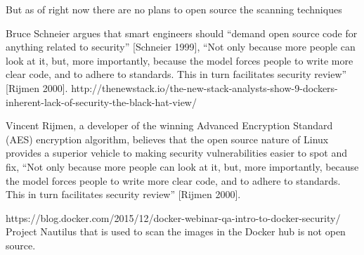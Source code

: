 %


But as of right now there are no plans to open source the scanning techniques


Bruce Schneier argues that smart engineers should “demand open source code for anything related to security” [Schneier 1999],
“Not only because more people can look at it, but, more importantly, because the model forces people to write more clear code, and to adhere to standards. This in turn facilitates security review” [Rijmen 2000].
http://thenewstack.io/the-new-stack-analysts-show-9-dockers-inherent-lack-of-security-the-black-hat-view/

Vincent Rijmen, a developer of the winning Advanced Encryption Standard (AES) encryption algorithm, believes that the open source nature of Linux provides a superior vehicle to making security vulnerabilities easier to spot and fix, “Not only because more people can look at it, but, more importantly, because the model forces people to write more clear code, and to adhere to standards. This in turn facilitates security review” [Rijmen 2000].

https://blog.docker.com/2015/12/docker-webinar-qa-intro-to-docker-security/
Project Nautilus that is used to scan the images in the Docker hub is not open source.

